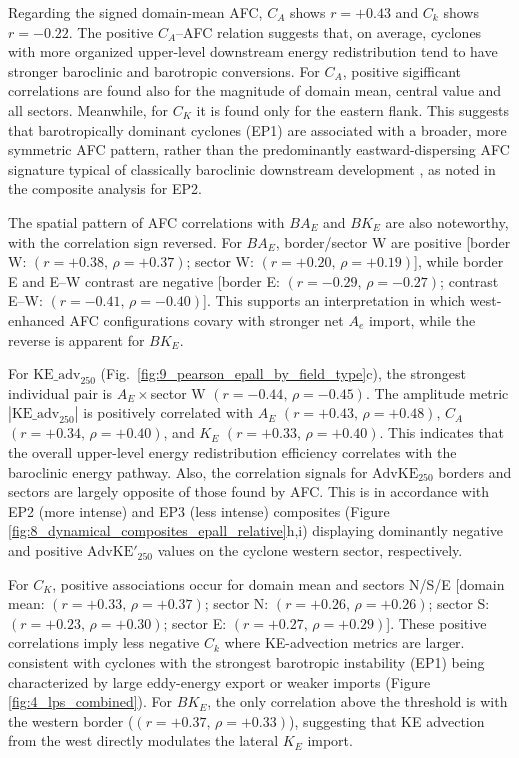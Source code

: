 \documentclass[pdflatex,sn-chicago]{sn-jnl}%
\theoremstyle{plain}
\theoremstyle{definition}
\theoremstyle{remark}
\theoremstyle{definition}
\begin{document}
Regarding the signed domain-mean AFC, $C_A$ shows $r = +0.43$ and $C_k$ shows $r = -0.22$. The positive $C_A$–AFC relation suggests that, on average, cyclones with more organized upper-level downstream energy redistribution tend to have stronger baroclinic and barotropic conversions. For $C_A$, positive sigifficant correlations are found also for the magnitude of domain mean, central value and all sectors. Meanwhile, for $C_K$ it is found only for the eastern flank. This suggests that barotropically dominant cyclones (EP1) are associated with a broader, more symmetric AFC pattern, rather than the predominantly eastward-dispersing AFC signature typical of classically
baroclinic downstream development \citep{orlanski1991life}, as noted in the composite analysis for EP2.

The spatial pattern of AFC correlations with $BA_E$ and $BK_E$ are also noteworthy, with the correlation sign reversed. For $BA_E$, border/sector W are positive [border W: $(r=+0.38,\,\rho=+0.37)$; sector W: $(r=+0.20,\,\rho=+0.19)$], while border E and E--W contrast are negative [border E: $(r=-0.29,\,\rho=-0.27)$; contrast E--W: $(r=-0.41,\,\rho=-0.40)$]. This supports an interpretation in which west-enhanced AFC configurations covary with stronger net $A_e$ import, while the reverse is apparent for $BK_E$.

For $\mathrm{KE\_adv}_{250}$ (Fig.~\ref{fig:9_pearson_epall_by_field_type}c), the strongest individual pair is $A_E\times$sector W $(r=-0.44,\,\rho=-0.45)$. The amplitude metric $|\mathrm{KE\_adv}_{250}|$ is positively correlated with $A_E$ $(r=+0.43,\,\rho=+0.48)$, $C_A$ $(r=+0.34,\,\rho=+0.40)$, and $K_E$ $(r=+0.33,\,\rho=+0.40)$. This indicates that the overall upper-level energy redistribution efficiency correlates with the baroclinic energy pathway. Also, the correlation signals for $\mathrm{AdvKE}_{250}$ borders and sectors are largely opposite of those found by AFC. This is in accordance with EP2 (more intense) and EP3 (less intense) composites (Figure \ref{fig:8_dynamical_composites_epall_relative}h,i) displaying dominantly negative and positive $\mathrm{AdvKE'}_{250}$ values on the cyclone western sector, respectively.

For $C_K$, positive associations occur for domain mean and sectors N/S/E [domain mean: $(r=+0.33,\,\rho=+0.37)$; sector N: $(r=+0.26,\,\rho=+0.26)$; sector S: $(r=+0.23,\,\rho=+0.30)$; sector E: $(r=+0.27,\,\rho=+0.29)$]. These positive correlations imply less negative $C_k$ where KE-advection metrics are larger. consistent with cyclones with the strongest barotropic instability (EP1) being characterized by large eddy-energy export or weaker imports (Figure \ref{fig:4_lps_combined}). For $BK_E$, the only correlation above the threshold is with the western border ($(r=+0.37,\,\rho=+0.33)$), suggesting that KE advection from the west directly modulates the lateral $K_E$ import.
\end{document}
